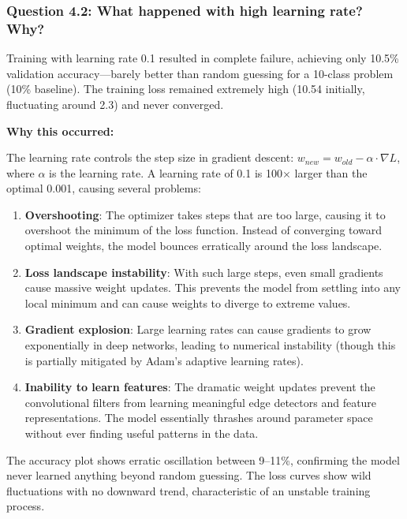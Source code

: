 \subsubsection{Question 4.2: What happened with high learning rate? Why?}

Training with learning rate 0.1 resulted in complete failure, achieving only 10.5\% validation accuracy---barely better than random guessing for a 10-class problem (10\% baseline). The training loss remained extremely high (10.54 initially, fluctuating around 2.3) and never converged.

\textbf{Why this occurred:}

The learning rate controls the step size in gradient descent: $w_{new} = w_{old} - \alpha \cdot \nabla L$, where $\alpha$ is the learning rate. A learning rate of 0.1 is 100$\times$ larger than the optimal 0.001, causing several problems:

\begin{enumerate}
    \item \textbf{Overshooting}: The optimizer takes steps that are too large, causing it to overshoot the minimum of the loss function. Instead of converging toward optimal weights, the model bounces erratically around the loss landscape.
    
    \item \textbf{Loss landscape instability}: With such large steps, even small gradients cause massive weight updates. This prevents the model from settling into any local minimum and can cause weights to diverge to extreme values.
    
    \item \textbf{Gradient explosion}: Large learning rates can cause gradients to grow exponentially in deep networks, leading to numerical instability (though this is partially mitigated by Adam's adaptive learning rates).
    
    \item \textbf{Inability to learn features}: The dramatic weight updates prevent the convolutional filters from learning meaningful edge detectors and feature representations. The model essentially thrashes around parameter space without ever finding useful patterns in the data.
\end{enumerate}

The accuracy plot shows erratic oscillation between 9--11\%, confirming the model never learned anything beyond random guessing. The loss curves show wild fluctuations with no downward trend, characteristic of an unstable training process.

